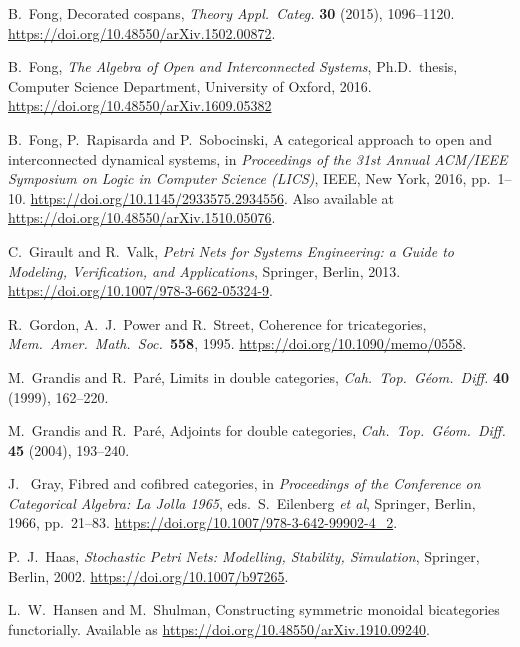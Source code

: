 \documentclass[a4paper,onecolumn, superscriptaddress,10pt, accepted=2022-03-25, issue=SS, volume=VV, shorttitle=papers/compositionality-VV-SS]{compositionalityarticle}
\begin{document}
\begin{thebibliography}{100}
 B.\ Fong, Decorated cospans, \emph{Theory Appl.\ Categ.} \textbf{30} (2015), 1096--1120.  \href{https://doi.org/10.48550/arXiv.1502.00872}{https://doi.org/10.48550/arXiv.1502.00872}.

 B.\ Fong, \textsl{The Algebra of Open and Interconnected Systems},
Ph.D.\ thesis, Computer Science Department, University of Oxford, 2016.  \href{https://doi.org/10.48550/arXiv.1609.05382}{https://doi.org/10.48550/arXiv.1609.05382}

 B.\ Fong, P.\ Rapisarda and P.\ Sobocinski, A categorical approach to open and interconnected dynamical systems, in \textsl{Proceedings 
of the 31st Annual ACM/IEEE Symposium on Logic in Computer Science (LICS)}, IEEE, New York, 2016, pp.\ 1--10. 
\href{https://doi.org/10.1145/2933575.2934556}{https://doi.org/10.1145/2933575.2934556}. Also available at
\href{https://doi.org/10.48550/arXiv.1510.05076}{https://doi.org/10.48550/arXiv.1510.05076}.

 C.\ Girault and R.\ Valk, \textsl{Petri Nets for Systems Engineering: a Guide to Modeling, Verification, and Applications}, 
Springer, Berlin, 2013. \href{https://doi.org/10.1007/978-3-662-05324-9}{https://doi.org/10.1007/978-3-662-05324-9}.

 R.\ Gordon, A.\ J.\ Power and R.\ Street, Coherence for tricategories, \textsl{Mem.\ Amer.\ Math.\ Soc.\ }\textbf{558}, 1995. 
\href{https://doi.org/10.1090/memo/0558}{https://doi.org/10.1090/memo/0558}.

 M.\ Grandis and R.\ Par\'e, Limits in double categories, \textsl{Cah.\ Top.\ G\'eom.\ Diff.} \textbf{40} (1999), 162--220.

 M.\ Grandis and R.\ Par\'e, Adjoints for double categories, 
 \textsl{Cah.\ Top.\ G\'eom.\ Diff.} \textbf{45} (2004), 193--240.

 J. \ Gray, Fibred and cofibred categories, in \textsl{Proceedings of the Conference on Categorical Algebra: La Jolla 1965}, eds.\ S.\ 
Eilenberg \textit{et al}, Springer, Berlin, 1966, pp.\ 21--83. 
\href{https://doi.org/10.1007/978-3-642-99902-4\_2}{https://doi.org/10.1007/978-3-642-99902-4\_2}.

 P.\ J.\ Haas, \textsl{Stochastic Petri Nets: Modelling, Stability, Simulation},
Springer, Berlin, 2002. \href{https://doi.org/10.1007/b97265}{https://doi.org/10.1007/b97265}.

  L.\ W.\ Hansen and M.\ Shulman, Constructing symmetric monoidal bicategories functorially.  Available as \href{https://doi.org/10.48550/arXiv.1910.09240}{https://doi.org/10.48550/arXiv.1910.09240}.


\end{thebibliography}
\end{document}
